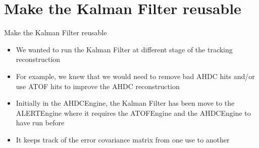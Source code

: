 \documentclass[10pt,aspectratio=43]{beamer}
\begin{document}
\section{Make the Kalman Filter reusable}
\begin{frame}{Make the Kalman Filter reusable}
    \begin{itemize}
        \item We wanted to run the Kalman Filter at different stage of the tracking reconstruction
        \item For example, we knew that we would need to remove bad AHDC hits and/or use ATOF hits to improve the AHDC reconstruction
        \item Initially in the AHDCEngine, the Kalman Filter has been move to the ALERTEngine where it requires the ATOFEngine and the AHDCEngine to have run before
        \item It keeps track of the error covariance matrix from one use to another
    \end{itemize}

    \vspace{0.5cm}

\end{frame}
\end{document}
